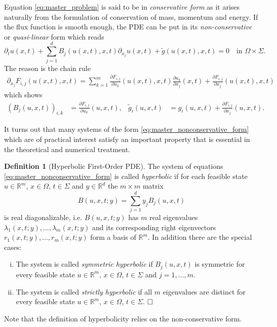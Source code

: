 \documentclass[a4paper,12pt]{article}
\theoremstyle{definition}
\newtheorem{Def}{Definition}
\theoremstyle{definition}
\newcommand{\Dim}{d}
\begin{document}
Equation \eqref{eq:master_problem} is said to be in \textit{conservative form} as it arises naturally
from the formulation of conservation of mass, momentum and energy.
If the flux function is smooth enough, the PDE can be put in its \textit{non-conservative}
or \textit{quasi-linear} form which reads
\begin{equation}
\label{eq:master_nonconservative_form}
\partial_t u(x,t) + \sum_{j=1}^{\Dim} B_j(u(x,t),x,t) \partial_{x_j} u(x,t) + \tilde{g}(u(x,t),x,t) = 0
\quad\text{in $\Omega\times\Sigma$} .
\end{equation}
The reason is the chain rule
\begin{align*}
\partial_{x_j} F_{i,j}(u(x,t),x,t) = \sum_{k=1}^m \frac{\partial F_{i,j}}{\partial u_k}( u(x,t),x,t)
\frac{\partial u_k}{\partial x_j} (x,t) + \frac{\partial F_{i,j}}{\partial x_j} (u(x,t),x,t)
\end{align*}
which shows
\begin{align*}
\left(B_j(u,x,t)\right)_{i,k} &= \frac{\partial F_{i,j}}{\partial u_k}(u,x,t), &
\tilde{g}_i(u,x,t) &= g_i(u,x,t) + \frac{\partial F_{i,j}}{\partial x_j} (u ,x,t) .
\end{align*}


It turns out that many systems of the form \eqref{eq:master_nonconservative_form}
which are of practical interest satisfy an important property that is essential in the theoretical and numerical treatment.
\begin{Def}[Hyperbolic First-Order PDE]\label{def:HyperbolicSystems}
	The system of equations \eqref{eq:master_nonconservative_form} is called \textit{hyperbolic} if
	for each feasible state $u\in\mathbb{R}^m$, $x\in\Omega$, $t\in\Sigma$ and
	$y\in\mathbb{R}^{\Dim}$ the $m\times m$ matrix
	\begin{equation}\label{eq:BMatrix}
	B(u,x,t; y) = \sum_{j=1}^{\Dim} y_j B_j(u,x,t)
	\end{equation}
	is real diagonalizable, i.e. $B(u,x,t;y)$ has $m$ real eigenvalues $\lambda_1(x,t;y), \ldots, \lambda_m(x,t;y)$
	and its corresponding right eigenvectors $r_1(x,t;y), \ldots, r_m(x,t;y)$ form a basis of $\mathbb{R}^m$.
	In addition there are the special cases:
	\begin{enumerate}[i)]
		\item The system is called \textit{symmetric hyperbolic} if $B_j(u,x,t)$ is symmetric for every
		feasible state $u\in\mathbb{R}^m$, $x\in\Omega$, $t\in\Sigma$ and $j=1,\ldots,m$.
		\item The system is called \textit{strictly hyperbolic} if all $m$ eigenvalues are distinct for
		every feasible state $u\in\mathbb{R}^m$, $x\in\Omega$, $t\in\Sigma$. $\hfill\square$
	\end{enumerate}
\end{Def}
Note that the definition of hyperbolicity relies on the non-conservative form.
\end{document}
